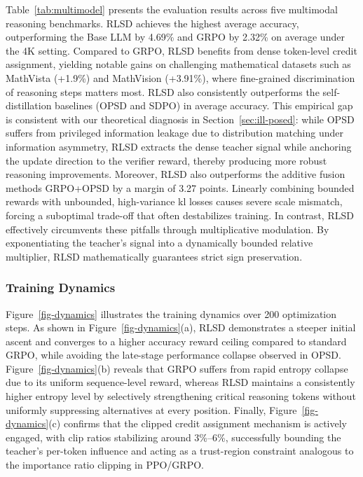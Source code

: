 \documentclass[]{jingdong}
\begin{document}
Table~\ref{tab:multimodel} presents the evaluation results across five multimodal reasoning benchmarks. RLSD achieves the highest average accuracy, outperforming the Base LLM by 4.69\% and GRPO by 2.32\% on average under the 4K setting. Compared to GRPO, RLSD benefits from dense token-level credit assignment, yielding notable gains on challenging mathematical datasets such as MathVista (+1.9\%) and MathVision (+3.91\%), where fine-grained discrimination of reasoning steps matters most. RLSD also consistently outperforms the self-distillation baselines (OPSD and SDPO) in average accuracy. This empirical gap is consistent with our theoretical diagnosis in Section~\ref{sec:ill-posed}: while OPSD suffers from privileged information leakage due to distribution matching under information asymmetry, RLSD extracts the dense teacher signal while anchoring the update direction to the verifier reward, thereby producing more robust reasoning improvements. Moreover, RLSD also outperforms the additive fusion methods GRPO+OPSD by a margin of 3.27 points. Linearly combining bounded rewards with unbounded, high-variance kl losses causes severe scale mismatch, forcing a suboptimal trade-off that often destabilizes training. In contrast, RLSD effectively circumvents these pitfalls through multiplicative modulation. By exponentiating the teacher's signal into a dynamically bounded relative multiplier, RLSD mathematically guarantees strict sign preservation.

\subsubsection{Training Dynamics}
\label{sec:training-dynamics}



Figure~\ref{fig-dynamics} illustrates the training dynamics over 200 optimization steps. As shown in Figure~\ref{fig-dynamics}(a), RLSD demonstrates a steeper initial ascent and converges to a higher accuracy reward ceiling compared to standard GRPO, while avoiding the late-stage performance collapse observed in OPSD. Figure~\ref{fig-dynamics}(b) reveals that GRPO suffers from rapid entropy collapse due to its uniform sequence-level reward, whereas RLSD maintains a consistently higher entropy level by selectively strengthening critical reasoning tokens without uniformly suppressing alternatives at every position. Finally, Figure~\ref{fig-dynamics}(c) confirms that the clipped credit assignment mechanism is actively engaged, with clip ratios stabilizing around 3\%--6\%, successfully bounding the teacher's per-token influence and acting as a trust-region constraint analogous to the importance ratio clipping in PPO/GRPO.
\end{document}
